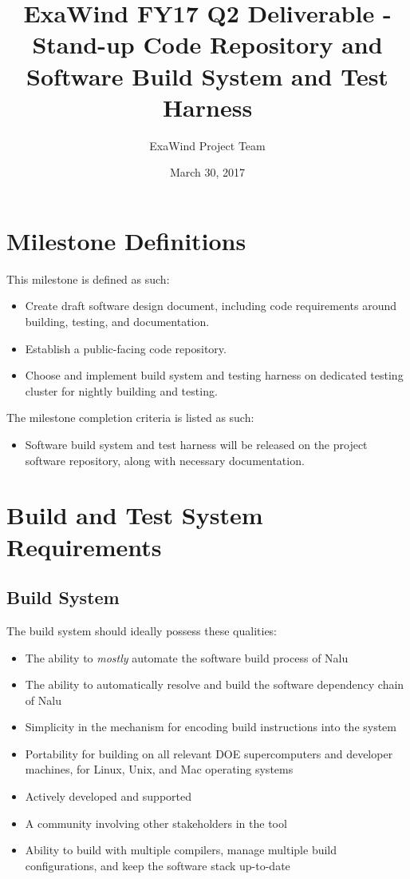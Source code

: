 \documentclass[12pt, oneside]{article}
\title{ExaWind FY17 Q2 Deliverable - Stand-up Code Repository and Software Build System and Test Harness}
\author{ExaWind Project Team}
\date{March 30, 2017}
\begin{document}
\maketitle

\section{Milestone Definitions}

\noindent This milestone is defined as such:

\begin{itemize}
	\item Create draft software design document, including code requirements around building, testing, and documentation.	
	\item Establish a public-facing code repository.
        \item Choose and implement build system and testing harness on dedicated testing cluster for nightly building and testing.
\end{itemize}

\noindent The milestone completion criteria is listed as such:

\begin{itemize}
	\item Software build system and test harness will be released on the project software repository, along with necessary documentation.
\end{itemize}

\section{Build and Test System Requirements}

\subsection{Build System}
The build system should ideally possess these qualities:
\begin{itemize}
	\item The ability to \textit{mostly} automate the software build process of Nalu
	\item The ability to automatically resolve and build the software dependency chain of Nalu
	\item Simplicity in the mechanism for encoding build instructions into the system
	\item Portability for building on all relevant DOE supercomputers and developer machines, for Linux, Unix, and Mac operating systems
	\item Actively developed and supported
	\item A community involving other stakeholders in the tool
	\item Ability to build with multiple compilers, manage multiple build configurations, and keep the software stack up-to-date
\end{itemize}
\end{document}
